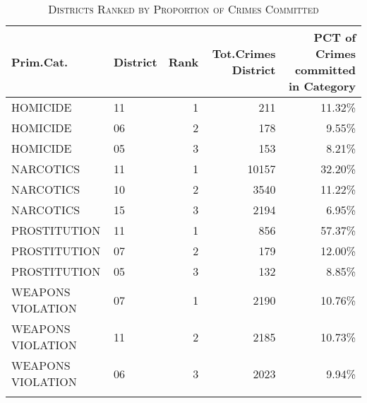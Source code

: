 \documentclass[a4paper]{article}
\begin{document}
\begin{table}[!htbp] \centering 
\begin{adjustwidth}{1.25cm}{-0cm}
\begin{threeparttable}
\small
\captionsetup{font=small, justification=raggedright,singlelinecheck=false}
\caption{\textsc{Districts Ranked by Proportion of Crimes Committed}}
\centering 
  \label{}
\small 
\begin{tabular}{@{\extracolsep{10pt}}llrrr} 
\\[-5.8ex]\hline 

\toprule
  Prim.Cat. & District &  Rank &  Tot.Crimes District &  PCT of Crimes committed in Category \\
\midrule
         HOMICIDE &       11 &                     1 &                          211 &                   11.32\% \\
         HOMICIDE &       06 &                     2 &                          178 &                    9.55\% \\
         HOMICIDE &       05 &                     3 &                          153 &                    8.21\% \\
        NARCOTICS &       11 &                     1 &                        10157 &                   32.20\% \\
        NARCOTICS &       10 &                     2 &                         3540 &                   11.22\% \\
        NARCOTICS &       15 &                     3 &                         2194 &                    6.95\% \\
     PROSTITUTION &       11 &                     1 &                          856 &                   57.37\% \\
     PROSTITUTION &       07 &                     2 &                          179 &                   12.00\% \\
     PROSTITUTION &       05 &                     3 &                          132 &                    8.85\% \\
WEAPONS VIOLATION &       07 &                     1 &                         2190 &                   10.76\% \\
WEAPONS VIOLATION &       11 &                     2 &                         2185 &                   10.73\% \\
WEAPONS VIOLATION &       06 &                     3 &                         2023 &                    9.94\% \\
\bottomrule
\hline \\[-3.5ex] 
\end{tabular} 
\begin{tablenotes}
      \small
      \item\textit{ }
    \end{tablenotes}
\end{threeparttable}
\end{adjustwidth}
%
\end{table}
\end{document}
